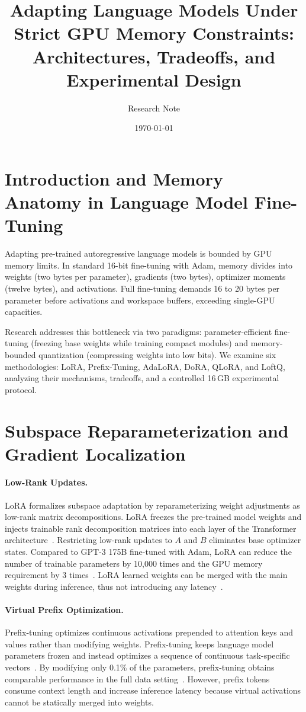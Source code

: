 \documentclass[11pt,a4paper]{article}
\title{Adapting Language Models Under Strict GPU Memory Constraints:\\Architectures, Tradeoffs, and Experimental Design}
\author{Research Note}
\date{\today}
\begin{document}
\maketitle

\section{Introduction and Memory Anatomy in Language Model Fine-Tuning}

Adapting pre-trained autoregressive language models is bounded by GPU memory limits. In standard 16-bit fine-tuning with Adam, memory divides into weights (two bytes per parameter), gradients (two bytes), optimizer moments (twelve bytes), and activations. Full fine-tuning demands 16 to 20 bytes per parameter before activations and workspace buffers, exceeding single-GPU capacities.

Research addresses this bottleneck via two paradigms: parameter-efficient fine-tuning (freezing base weights while training compact modules) and memory-bounded quantization (compressing weights into low bits). We examine six methodologies: LoRA, Prefix-Tuning, AdaLoRA, DoRA, QLoRA, and LoftQ, analyzing their mechanisms, tradeoffs, and a controlled 16\,GB experimental protocol.

\section{Subspace Reparameterization and Gradient Localization}

\paragraph{Low-Rank Updates.}
LoRA formalizes subspace adaptation by reparameterizing weight adjustments as low-rank matrix decompositions. LoRA freezes the pre-trained model weights and injects trainable rank decomposition matrices into each layer of the Transformer architecture~\citep{hu2021lora}. Restricting low-rank updates to $A$ and $B$ eliminates base optimizer states. Compared to GPT-3 175B fine-tuned with Adam, LoRA can reduce the number of trainable parameters by 10,000 times and the GPU memory requirement by 3 times~\citep{hu2021lora}. LoRA learned weights can be merged with the main weights during inference, thus not introducing any latency~\citep{hu2021lora}.

\paragraph{Virtual Prefix Optimization.}
Prefix-tuning optimizes continuous activations prepended to attention keys and values rather than modifying weights. Prefix-tuning keeps language model parameters frozen and instead optimizes a sequence of continuous task-specific vectors~\citep{li2021prefix}. By modifying only 0.1\% of the parameters, prefix-tuning obtains comparable performance in the full data setting~\citep{li2021prefix}. However, prefix tokens consume context length and increase inference latency because virtual activations cannot be statically merged into weights.
\end{document}
